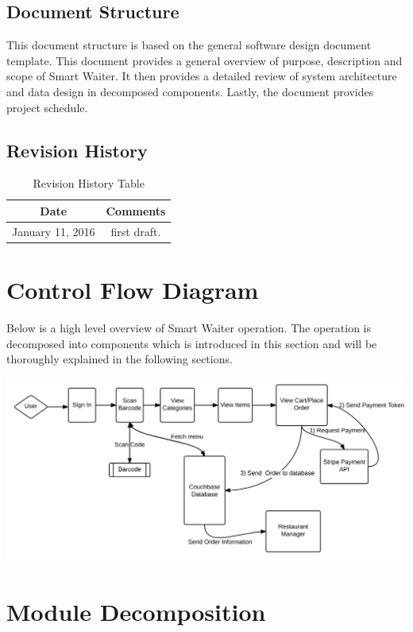 \documentclass[12pt, titlepage]{article}
\begin{document}
\subsection{Document Structure}
This document structure is based on the general software design document template. This document provides a general overview of purpose, description and scope of Smart Waiter. It then provides a detailed review of system architecture and data design in decomposed components. Lastly, the document provides project schedule. 

\subsection{Revision History}

\begin{table}[H]
\begin{tabular}{|c|c|}
\hline
\textbf{Date}  & \textbf{Comments} \\ \hline
January 11, 2016 &  first draft. \\ 
\hline
\end{tabular}
\caption{Revision History Table}
\end{table}

\section{Control Flow Diagram}
Below is a high level overview of Smart Waiter operation. The operation is decomposed into components which is introduced in this section and will be thoroughly explained in the following sections. 


\includegraphics[width=150mm,scale=0.5]{OverallOperation.png}

\section{Module Decomposition}
\end{document}
